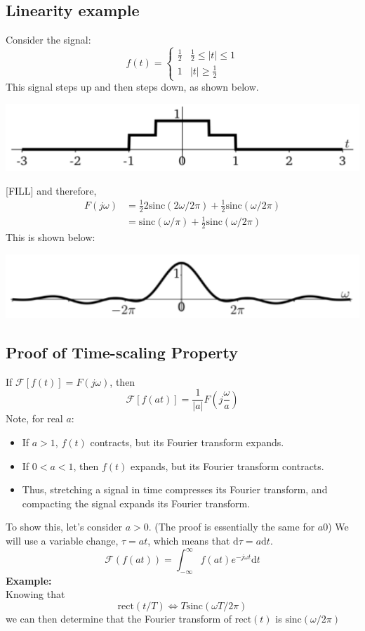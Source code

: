 \documentclass[10pt]{article}
\newcommand{\example}{\textbf{Example: }}
\newcommand{\sinc}{\text{sinc}}
\begin{document}
\subsection*{Linearity example}
Consider the signal:
\[f(t) = \begin{cases}\frac{1}{2} & \frac{1}{2} \leq |t| \leq 1 \\ 1 & |t| \geq \frac{1}{2}\end{cases}\]
This signal steps up and then steps down, as shown below.
\begin{center}
    \includegraphics{W5_4.png}
\end{center}
[FILL]
and therefore,
\begin{align*}
    F(j\omega) &= \frac{1}{2}2\sinc(2\omega/2\pi) + \frac{1}{2} \sinc(\omega/2\pi)\\
    &= \sinc(\omega/\pi) + \frac{1}{2} \sinc(\omega/2\pi)
\end{align*}
This is shown below:
\begin{center}
    \includegraphics{W5_5.png}
\end{center}

\subsection*{Proof of Time-scaling Property}
If $\mathcal{F}[f(t)] = F(j\omega)$, then
\[\boxed{\mathcal{F}[f(at)] = \frac{1}{|a|}F\left(j \frac{\omega}{a}\right)}\] 
Note, for real $a$:
\begin{itemize}
    \item If $a > 1$, $f(t)$ contracts, but its Fourier transform expands.
    \item If $0 < a < 1$, then $f(t)$ expands, but its Fourier transform contracts.
    \item Thus, stretching a signal in time compresses its Fourier transform, and compacting the signal expands its Fourier transform.
\end{itemize}
To show this, let's consider $a > 0$.  (The proof is essentially the same for $a  0$)  We will use a variable change, $\tau = at$, which means that $\text{d}\tau = a\text{d}t$.
\[\mathcal{F}(f(at)) = \int_{-\infty}^\infty f(at) e^{-j\omega t} \text{d}t\]
\example\\
Knowing that
\[\text{rect}(t/T) \Longleftrightarrow T\sinc(\omega T/2\pi)\]
we can then determine that the Fourier transform of $\text{rect}(t)$ is $\sinc(\omega/2\pi)$
\end{document}
